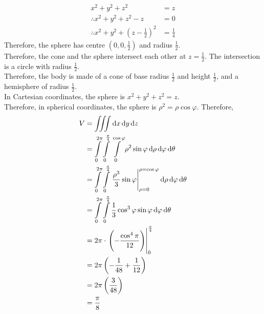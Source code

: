\documentclass[fleqn, a4paper, 12pt, twoside]{article}
\theoremstyle{definition}
\theoremstyle{theorem}
\begin{document}
{\begin{solution}
	\begin{align*}
		x^2 + y^2 + z^2                                         & = z \\
		\therefore x^2 + y^2 + z^2 - z                          & = 0 \\
		\therefore x^2 + y^2 + \left( z - \frac{1}{2} \right)^2 & = \frac{1}{4}
	\end{align*}
	Therefore, the sphere has centre $\left( 0 , 0 , \frac{1}{2} \right)$ and radius $\frac{1}{2}$.\\
	Therefore, the cone and the sphere intersect each other at $z = \frac{1}{2}$.
	The intersection is a circle with radius $\frac{1}{2}$.\\
	Therefore, the body is made of a cone of base radius $\frac{1}{2}$ and height $\frac{1}{2}$, and a hemisphere of radius $\frac{1}{2}$.\\
	In Cartesian coordinates, the sphere is $x^2 + y^2 + z^2 = z$.\\
	Therefore, in spherical coordinates, the sphere is $\rho^2 = \rho \cos \varphi$.
	Therefore,
	\begin{align*}
		V & = \iiint \dif x \dif y \dif z                                                                                                                                              \\
                  & = \int\limits_{0}^{2 \pi} \int\limits_{0}^{\frac{\pi}{4}} \int\limits_{0}^{\cos \varphi} \rho^2 \sin \varphi \dif \rho \dif \varphi \dif \theta                            \\
                  & = \int\limits_{0}^{2 \pi} \int\limits_{0}^{\frac{\pi}{4}} \left. \frac{\rho^3}{3} \sin \varphi \right|_{\rho = 0}^{\rho = \cos \varphi} \dif \rho \dif \varphi \dif \theta \\
                  & = \int\limits_{0}^{2 \pi} \int\limits_{0}^{\frac{\pi}{4}} \frac{1}{3} \cos^3 \varphi \sin \varphi \dif \varphi \dif \theta                                                 \\
                  & = 2 \pi \cdot \left. \left( -\frac{\cos^4 \pi}{12} \right) \right|_{0}^{\frac{\pi}{4}}                                                                                     \\
                  & = 2 \pi \left( -\frac{1}{48} + \frac{1}{12} \right)                                                                                                                        \\
                  & = 2 \pi \left( \frac{3}{48} \right)                                                                                                                                        \\
                  & = \frac{\pi}{8}
	\end{align*}
\end{solution}

}
\end{document}
